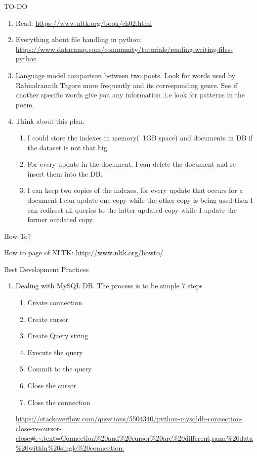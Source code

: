 \documentclass[12pt]{article}
\begin{document}
\begin{center}
    TO-DO
\end{center}
\begin{enumerate}
    \item Read: \url{https://www.nltk.org/book/ch02.html}
    \item Everything about file handling in python: \url{https://www.datacamp.com/community/tutorials/reading-writing-files-python}
    \item Language model comparison between two poets. Look for words used by Rabindranath Tagore more frequently and its corresponding genre. See if another specific words give you any information .i.e look for patterns in the poem.
    \item Think about this plan.
        \begin{enumerate}
            \item I could store the indexes in memory(~1GB space) and documents in DB if the dataset is not that big.
            \item For every update in the document, I can delete the document and re-insert them into the DB. 
            \item I can keep two copies of the indexes, for every update that occurs for a document I can update one copy while the other copy is being used then I can redirect all queries to the latter updated copy while I update the former outdated copy.  
        \end{enumerate}
\end{enumerate}

\begin{center}
    How-To?
\end{center}
How to page of NLTK: \url{http://www.nltk.org/howto/}
\begin{center}
    Best Development Practices
\end{center}
\begin{enumerate}
    \item Dealing with MySQL DB. The process is to be simple 7 steps
    \begin{enumerate}
        \item 
        Create connection
        \item Create cursor
        \item Create Query string
        \item Execute the query
        \item Commit to the query
        \item Close the cursor
        \item Close the connection 
    \end{enumerate}
    \url{https://stackoverflow.com/questions/5504340/python-mysqldb-connection-close-vs-cursor-close#:~:text=Connection%20and%20cursor%20are%20different,same%20data%20within%20single%20connection.}

\end{enumerate}
\end{document}
